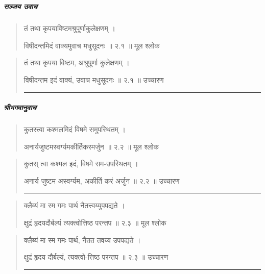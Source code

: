 \chapter{}

\sanskrit
\paragraph{\sanskrit सञ्जय उवाच}

\begin{quotation}
तं तथा कृपयाविष्टमश्रुपूर्णाकुलेक्षणम्‌  ।  

विषीदन्तमिदं वाक्यमुवाच मधुसूदनः  ॥ २.१ ॥  मूल श्लोक
\end{quotation}

\begin{quotation}

तं तथा कृपया विष्टम, अश्रुपूर्णा कुलेक्षणम्‌  ।  

विषीदन्तम इदं वाक्यं, उवाच मधुसूदनः  ॥ २.१ ॥  उच्चारण

\noindent\rule{16cm}{0.4pt} 
\end{quotation}

\paragraph{\sanskrit श्रीभगवानुवाच}

\begin{quotation}

कुतस्त्वा कश्मलमिदं विषमे समुपस्थितम्‌  ।  

अनार्यजुष्टमस्वर्ग्यमकीर्तिकरमर्जुन  ॥ २.२ ॥  मूल श्लोक
\end{quotation}

\begin{quotation}

कुतस् त्वा कश्मल इदं, विषमे सम-उपस्थितम्‌  ।  

अनार्य जुष्टम अस्वर्ग्यम, अकीर्ति करं अर्जुन  ॥ २.२ ॥  उच्चारण

\noindent\rule{16cm}{0.4pt} 
\end{quotation}


\begin{quotation}

क्लैब्यं मा स्म गमः पार्थ नैतत्त्वय्युपपद्यते  ।  

क्षुद्रं हृदयदौर्बल्यं त्यक्त्वोत्तिष्ठ परन्तप  ॥ २.३ ॥  मूल श्लोक
\end{quotation}

\begin{quotation}

क्लैब्यं मा स्म गमः पार्थ, नैतत तवय्य उपपद्यते  ।  

क्षुद्रं हृदय दौर्बल्यं, त्यक्त्वो-त्तिष्ठ परन्तप  ॥ २.३ ॥  उच्चारण

\noindent\rule{16cm}{0.4pt} 
\end{quotation}

